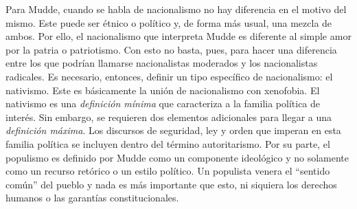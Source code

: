 Para Mudde, cuando se habla de nacionalismo no hay diferencia en el motivo del mismo. Este puede ser étnico o político y, de forma más usual, una mezcla de ambos. Por ello, el nacionalismo que interpreta Mudde es diferente al simple amor por la patria o patriotismo. Con esto no basta, pues, para hacer una diferencia entre los que podrían llamarse nacionalistas moderados y los nacionalistas radicales. Es necesario, entonces, definir un tipo específico de nacionalismo: el nativismo. Este es básicamente la unión de nacionalismo con xenofobia. El nativismo es una \textit{definición mínima} que caracteriza a la familia política de interés. Sin embargo, se requieren dos elementos adicionales para llegar a una \textit{definición máxima}. Los discursos de seguridad, ley y orden que imperan en esta familia política se incluyen dentro del término autoritarismo. Por su parte, el populismo es definido por Mudde como un componente ideológico y no solamente como un recurso retórico o un estilo político. Un populista venera el ``sentido común'' del pueblo y nada es más importante que esto, ni siquiera los derechos humanos o las garantías constitucionales.\\


